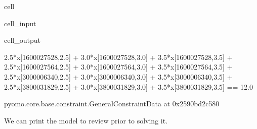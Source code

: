 \documentclass[letterpaper,10pt,english]{jupyterBook}
\begin{document}
\begin{sphinxuseclass}{cell}\begin{sphinxVerbatimInput}

\begin{sphinxuseclass}{cell_input}
\begin{sphinxVerbatim}[commandchars=\\\{\}]
  \PYG{p}{[}\PYG{p}{]}\PYG{p}{[}\PYG{p}{]}          
  
\end{sphinxVerbatim}

\end{sphinxuseclass}\end{sphinxVerbatimInput}
\begin{sphinxVerbatimOutput}

\begin{sphinxuseclass}{cell_output}
\begin{sphinxVerbatim}[commandchars=\\\{\}]
2.5*x[1600027528,2.5] + 3.0*x[1600027528,3.0] + 3.5*x[1600027528,3.5] + 2.5*x[1600027564,2.5] + 3.0*x[1600027564,3.0] + 3.5*x[1600027564,3.5] + 2.5*x[3000006340,2.5] + 3.0*x[3000006340,3.0] + 3.5*x[3000006340,3.5] + 2.5*x[3800031829,2.5] + 3.0*x[3800031829,3.0] + 3.5*x[3800031829,3.5]  ==  12.0
\end{sphinxVerbatim}

\begin{sphinxVerbatim}[commandchars=\\\{\}]
\PYGZlt{}pyomo.core.base.constraint.\PYGZus{}GeneralConstraintData at 0x2590bd2c580\PYGZgt{}
\end{sphinxVerbatim}

\end{sphinxuseclass}\end{sphinxVerbatimOutput}

\end{sphinxuseclass}
\sphinxAtStartPar
We can print the model to review prior to solving it.
\end{document}
